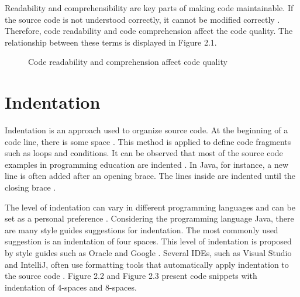 Readability and comprehensibility are key parts of making code maintainable. 
If the source code is not understood correctly, it cannot be modified correctly \cite{izu2025introducing}. Therefore, code readability and code comprehension affect the code quality. The relationship between these terms is displayed in Figure 2.1.



\begin{figure}[H]
\centering
{}
\caption{Code readability and  comprehension affect code quality}
\label{fig:readability-comprehension-quality}
\end{figure}




\section{Indentation}

Indentation is an approach used to organize source code. At the beginning of a code line, there is some space \cite{morzeck2023indentation}.
This method is applied to define code fragments such as loops and conditions.  It can be observed that most of the source code examples in programming education are indented \cite{morzeck2023indentation}. In Java, for instance, a new line is often added after an opening brace. The lines inside are indented until the closing brace \cite{hanenberg2024indentation}.


The level of indentation can vary in different programming languages and can be set as a personal preference \cite{bauer2017indentations}. Considering the programming language Java, there are many style guides suggestions for indentation. The most commonly used suggestion is an indentation of four spaces. This level of indentation is proposed by style guides such as Oracle and Google \cite{bauer2017indentations}.
Several IDEs, such as Visual Studio and IntelliJ, often use formatting tools that automatically apply indentation to the source code \cite{morzeck2023indentation}. Figure 2.2 and Figure 2.3 present code snippets with indentation of 4-spaces and 8-spaces.

